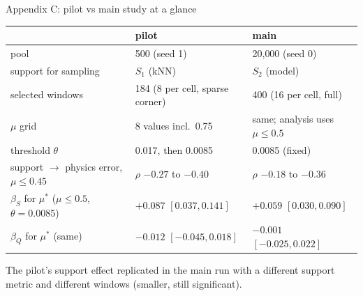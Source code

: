 \documentclass[aspectratio=169,11pt]{beamer}
\begin{document}
\begin{frame}{Appendix C: pilot vs main study at a glance}
\centering
\footnotesize
\begin{tabular}{@{}lll@{}}
\toprule
 & pilot & main\\
\midrule
pool & 500 (seed 1) & 20{,}000 (seed 0)\\
support for sampling & $S_1$ (kNN) & $S_2$ (model)\\
selected windows & 184 (8 per cell, sparse corner) & 400 (16 per cell, full)\\
$\mu$ grid & 8 values incl.\ 0.75 & same; analysis uses $\mu\le0.5$\\
threshold $\theta$ & 0.017, then 0.0085 & 0.0085 (fixed)\\
support $\to$ physics error, $\mu\le0.45$ & $\rho$ $-0.27$ to $-0.40$ & $\rho$ $-0.18$ to $-0.36$\\
$\beta_S$ for $\mu^*$ ($\mu\le0.5$, $\theta=0.0085$) & $+0.087$ $[0.037,0.141]$ & $+0.059$ $[0.030,0.090]$\\
$\beta_Q$ for $\mu^*$ (same) & $-0.012$ $[-0.045,0.018]$ & $-0.001$ $[-0.025,0.022]$\\
\bottomrule
\end{tabular}
\vspace{0.6em}

\raggedright\small The pilot's support effect replicated in the main run with a different support metric and different windows (smaller, still significant).
\end{frame}
\end{document}
